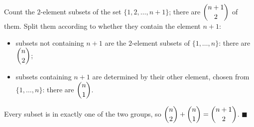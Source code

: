 Count the $2$-element subsets of the set $\{1,2,\dots,n+1\}$; there are $\dbinom{n+1}{2}$ of them. Split them according to whether they contain the element $n+1$:
\begin{itemize}
\item subsets not containing $n+1$ are the $2$-element subsets of $\{1,\dots,n\}$: there are $\dbinom n2$;
\item subsets containing $n+1$ are determined by their other element, chosen from $\{1,\dots,n\}$: there are $\dbinom n1$.
\end{itemize}
Every subset is in exactly one of the two groups, so $\dbinom n2+\dbinom n1=\dbinom{n+1}2$. $\blacksquare$
